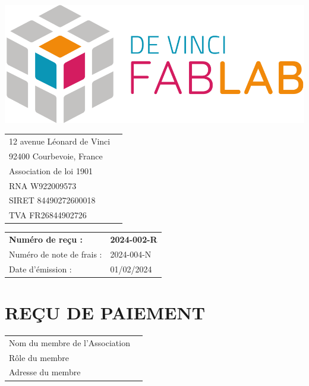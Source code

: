 \documentclass[11pt,a4paper]{article}
\begin{document}
\thispagestyle{empty}


\begin{minipage}{0.4\textwidth}
    \includegraphics[width=0.7\linewidth]{../assets/logo_fablab.png}

    \vspace{0.5cm}

    \begin{tabular}{ll}
        12 avenue Léonard de Vinci \\
        92400 Courbevoie, France   \\
        Association de loi 1901    \\
        RNA W922009573             \\
        SIRET 84490272600018       \\
        TVA  FR26844902726         \\
    \end{tabular}
\end{minipage}\begin{minipage}{0.6\textwidth}
    \begin{flushright}
        \begin{tabular}{ll}
            \textbf{Numéro de reçu :} & \textbf{2024-002-R} \\
            Numéro de note de frais : & 2024-004-N          \\
            Date d'émission :         & 01/02/2024          \\
        \end{tabular}
    \end{flushright}
\end{minipage}

\begin{minipage}[t]{0.5\textwidth}
    \hspace*{0pt}\vspace*{\fill}
    \section*{\LARGE REÇU DE PAIEMENT}
\end{minipage}\begin{minipage}[t]{0.5\textwidth}
    \begin{framed}
        \begin{tabular}{ll}
            Nom du membre de l'Association \\
            Rôle du membre                 \\
            Adresse du membre              \\
        \end{tabular}
    \end{framed}
    \vspace{0.1cm}
\end{minipage}
\end{document}
